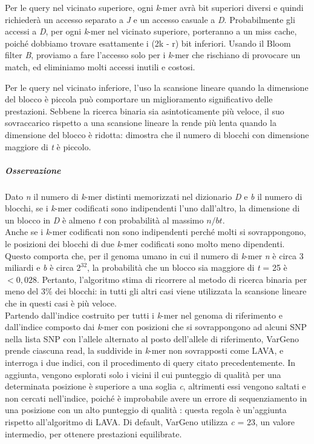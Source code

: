 \documentclass[../main.tex]{subfiles}
\begin{document}
Per le query nel vicinato superiore, ogni \textit{k}-mer avrà bit superiori diversi e quindi richiederà un accesso separato a \textit{J} e un accesso casuale a \textit{D}. Probabilmente gli accessi a \textit{D}, per ogni \textit{k}-mer nel vicinato superiore, porteranno a un miss cache, poiché dobbiamo trovare esattamente i (2k - r) bit inferiori. Usando il Bloom filter \textit{B}, proviamo a fare l'accesso solo per i \textit{k}-mer che rischiano di provocare un match, ed eliminiamo molti accessi inutili e costosi.

Per le query nel vicinato inferiore, l'uso la scansione lineare quando la dimensione del blocco è piccola può comportare un miglioramento significativo delle prestazioni. Sebbene la ricerca binaria sia asintoticamente più veloce, il suo sovraccarico rispetto a una scansione lineare la rende più lenta quando la dimensione del blocco è ridotta: \cite{sun-medvedev2018vargeno} dimostra che il numero di blocchi con dimensione maggiore di \textit{t} è piccolo. 

\subparagraph{Osservazione} Dato \textit{n} il numero di \textit{k}-mer distinti memorizzati nel dizionario \textit{D} e \textit{b} il numero di blocchi, se i \textit{k}-mer codificati sono indipendenti l'uno dall'altro, la dimensione di un blocco in \textit{D} è almeno \textit{t} con probabilità al massimo $n/bt$. \\

\noindent
Anche se i \textit{k}-mer codificati non sono indipendenti perché molti si sovrappongono, le posizioni dei blocchi di due \textit{k}-mer codificati sono molto meno dipendenti.  Questo comporta che, per il genoma umano in cui il numero di \textit{k}-mer \textit{n} è circa 3 miliardi e \textit{b} è circa $2^{32}$, la probabilità che un blocco sia maggiore di \textit{t} = 25 è $<0,028$. Pertanto, l'algoritmo stima di ricorrere al metodo di ricerca binaria per meno del 3\% dei blocchi: in tutti gli altri casi viene utilizzata la scansione lineare che in questi casi è più veloce.\\

\noindent
Partendo dall'indice costruito per tutti i \textit{k}-mer nel genoma di riferimento e dall'indice composto dai \textit{k}-mer con posizioni che si sovrappongono ad alcuni SNP nella lista SNP con l'allele alternato al posto dell'allele di riferimento, VarGeno prende ciascuna read, la suddivide in \textit{k}-mer non sovrapposti come LAVA, e interroga i due indici, con il procedimento di query citato precedentemente. In aggiunta, vengono esplorati solo i vicini il cui punteggio di qualità per una determinata posizione è superiore a una soglia \textit{c}, altrimenti essi vengono saltati e non cercati nell'indice, poiché è improbabile avere un errore di sequenziamento in una posizione con un alto punteggio di qualità \cite{sun-medvedev2018vargeno}: questa regola è un'aggiunta rispetto all'algoritmo di LAVA. Di default, VarGeno utilizza \textit{c} = 23, un valore intermedio, per ottenere prestazioni equilibrate. \\
\end{document}
